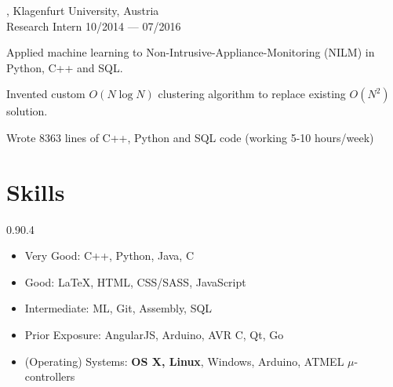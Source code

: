 \begin{entry}
	{, Klagenfurt University, Austria}
	{\\Research Intern}
	{10/2014 --- 07/2016}

\item Applied machine learning to Non-Intrusive-Appliance-Monitoring (NILM) in Python, C++ and SQL.
	\item Invented custom $O(N \log N)$ clustering algorithm to replace existing $O(N^2)$ solution.
	\item Wrote 8363 lines of C++, Python and SQL code (working 5-10 hours/week)
\end{entry}
\vspace{-2mm}

\section{Skills}{0.9}{0.4}
\vspace{-2mm}
\begin{multicols}{2}
	\begin{itemize}
		\item Very Good: C++, Python, Java, C
    \vspace{-2mm}
		\item Good: \LaTeX, HTML, CSS/SASS, JavaScript
    \vspace{-2mm}
		\item Intermediate: ML, Git, Assembly, SQL

		\item Prior Exposure: AngularJS, Arduino, AVR C, Qt, Go
    \vspace{-2mm}
		\item (Operating) Systems: \textbf{OS X, Linux}, Windows, Arduino, ATMEL $\mu$-controllers
    \\
	\end{itemize}
\end{multicols}

\vspace{-2mm}
